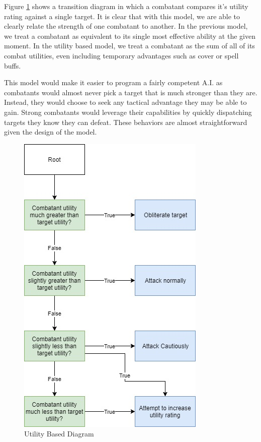 \documentclass[12pt,a4paper]{report}
\begin{document}
		Figure \ref{fig: Utility Based} shows a transition diagram in which a combatant compares it's utility rating against a single target. It is clear that with this model, we are able to clearly relate the strength of one combatant to another. In the previous model, we treat a combatant as equivalent to its single most effective ability at the given moment. In the utility based model, we treat a combatant as the sum of all of its combat utilities, even including temporary advantages such as cover or spell buffs. 
		
		This model would make it easier to program a fairly competent A.I. as combatants would almost never pick a target that is much stronger than they are. Instead, they would choose to seek any tactical advantage they may be able to gain. Strong combatants would leverage their capabilities by quickly dispatching targets they know they can defeat. These behaviors are almost straightforward given the design of the model.
		
		\begin{figure}[H]
			\centering
			\includegraphics[scale=.8]{utilityBased}
			\caption{Utility Based Diagram}
			\label{fig: Utility Based}
		\end{figure}
		
\end{document}
